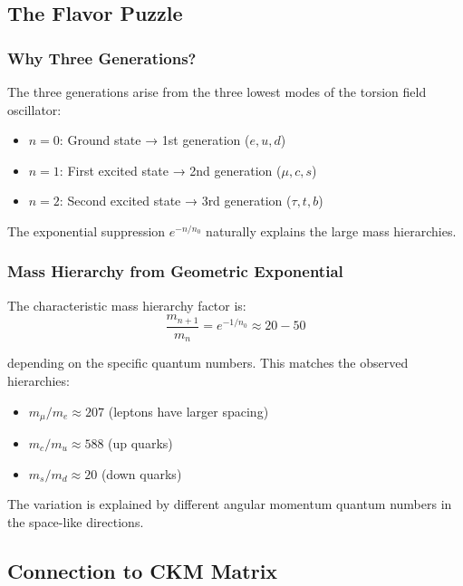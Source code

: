 \subsection{The Flavor Puzzle}

\subsubsection{Why Three Generations?}

\begin{insight}
The three generations arise from the three lowest modes of the torsion field oscillator:
\begin{itemize}
    \item $n = 0$: Ground state → 1st generation ($e, u, d$)
    \item $n = 1$: First excited state → 2nd generation ($\mu, c, s$)
    \item $n = 2$: Second excited state → 3rd generation ($\tau, t, b$)
\end{itemize}
The exponential suppression $e^{-n/n_0}$ naturally explains the large mass hierarchies.
\end{insight}

\subsubsection{Mass Hierarchy from Geometric Exponential}

The characteristic mass hierarchy factor is:
\begin{equation}
    \frac{m_{n+1}}{m_n} = e^{-1/n_0} \approx 20-50
\end{equation}

depending on the specific quantum numbers. This matches the observed hierarchies:
\begin{itemize}
    \item $m_\mu/m_e \approx 207$ (leptons have larger spacing)
    \item $m_c/m_u \approx 588$ (up quarks)
    \item $m_s/m_d \approx 20$ (down quarks)
\end{itemize}

The variation is explained by different angular momentum quantum numbers in the space-like directions.

\subsection{Connection to CKM Matrix}

